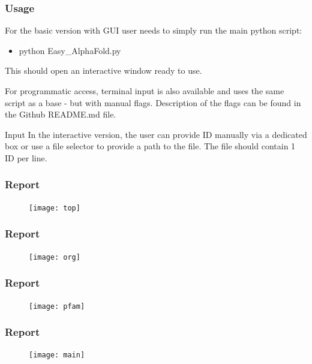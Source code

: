 \documentclass[10pt]{beamer}
\begin{document}
\begin{frame}
\frametitle{Usage}

For the basic version with GUI user needs to simply run the main python script:
\begin{itemize}
\item python Easy\_AlphaFold.py
\end{itemize}

This should open an interactive window ready to use. \newline\newline

For programmatic access, terminal input is also available and uses the same script as a base - but with manual flags.\newline
Description of the flags can be found in the Github README.md file.\newline\newline

Input\newline
In the interactive version, the user can provide ID manually via a dedicated box or use a file selector to provide a path to the file. The file should contain 1 ID per line.
\end{frame}

\begin{frame}
\frametitle{Report}
\begin{figure}[H]
\begin{center}
\texttt{[image: top]}
\end{center}
\end{figure}
\end{frame}

\begin{frame}
\frametitle{Report}
\begin{figure}[H]
\begin{center}
\texttt{[image: org]}
\end{center}
\end{figure}
\end{frame}

\begin{frame}
\frametitle{Report}
\begin{figure}[H]
\begin{center}
\texttt{[image: pfam]}
\end{center}
\end{figure}
\end{frame}

\begin{frame}
\frametitle{Report}
\begin{figure}[H]
\begin{center}
\texttt{[image: main]}
\end{center}
\end{figure}
\end{frame}
\end{document}
